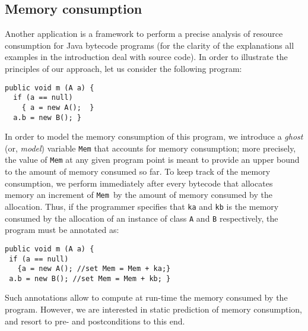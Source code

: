 \subsection{Memory consumption}

Another application is a framework to perform a precise analysis of resource consumption for
Java bytecode programs (for the clarity of the explanations all
examples in the introduction deal with source code).  In order
to illustrate the principles of our approach, let us consider the
following program:
\begin{verbatim}
public void m (A a) {
  if (a == null) 
    { a = new A();  }  
  a.b = new B(); }
\end{verbatim}
In order to model the memory consumption of this program, we introduce
a {\em ghost} (or, {\em model}) variable \verb!Mem! that accounts for
memory consumption; more precisely, the value of \verb!Mem! at any
given program point is meant to provide an upper bound to the amount
of memory consumed so far. To keep track of the memory consumption, we
perform immediately after every bytecode that allocates memory an
increment of \verb!Mem!\ by the amount of memory consumed by the
allocation. Thus, if the programmer specifies that \verb!ka! and
\verb!kb! is the memory consumed by the allocation of an instance of
class \verb!A! and \verb!B! respectively, the program must be
annotated as:
\begin{verbatim} 
public void m (A a) {
 if (a == null) 
   {a = new A(); //set Mem = Mem + ka;}  
 a.b = new B(); //set Mem = Mem + kb; }
\end{verbatim}
Such annotations allow to compute at run-time the memory consumed by
the program. However, we are interested in static prediction of memory
consumption, and resort to pre- and postconditions to this end.  

